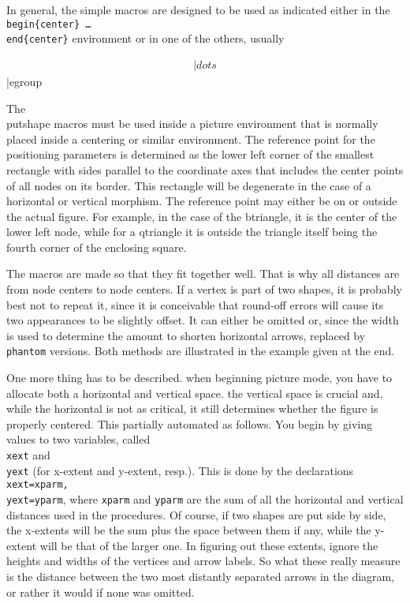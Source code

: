 {{{{{{{{{In general, the simple macros are designed to be used as indicated
either in the {\tt \\begin\{center\} \ldots \\end\{center\}} environment
or in one of the others, usually
{\verbatim
\begin{equation}\begin{array}{c}
|dots
\end{array}\end{equation}|egroup

The \\putshape macros must be used inside a picture environment that is
normally placed inside a centering or similar environment.  The
reference point for the positioning parameters is determined as the
lower left corner of the smallest rectangle with sides parallel to the
coordinate axes that includes the center points of all nodes on its
border.  This rectangle will be degenerate in the case of a horizontal
or vertical morphism.  The reference point may either be on or outside
the actual figure.  For example, in the case of the btriangle, it is the
center of the lower left node, while for a qtriangle it is outside the
triangle itself being the fourth corner of the enclosing square.

The macros are made so that they fit together well.  That is why all
distances are from node centers to node centers.  If a vertex is part of
two shapes, it is probably best not to repeat it, since it is
conceivable that round-off errors will cause its two appearances to be
slightly offset.  It can either be omitted or, since the width is used
to determine the amount to shorten horizontal arrows, replaced by {\tt
\\phantom} versions.  Both methods are illustrated in the example given
at the end.

One more thing has to be described.  when beginning picture mode, you
have to allocate both a horizontal and vertical space.  the vertical
space is crucial and, while the horizontal is not as critical, it still
determines whether the figure is properly centered.  This partially
automated as follows.  You begin by giving values to two variables,
called {\tt \\xext} and {\tt\\yext} (for x-extent and y-extent, resp.).
This is done by the declarations
{\tt\\xext=xparm, \\yext=yparm}, where {\tt xparm} and {\tt yparm} are
the sum of all the horizontal and vertical distances used in the
procedures.  Of course, if two shapes are put side by side, the
x-extents will be the sum plus the space between them if any, while the
y-extent will be that of the larger one.  In figuring out these extents,
ignore the heights and widths of the vertices and arrow labels.  So what
these really measure is the distance between the two most distantly
separated arrows in the diagram, or rather it would if none was omitted.

}}}}}}}}}}
